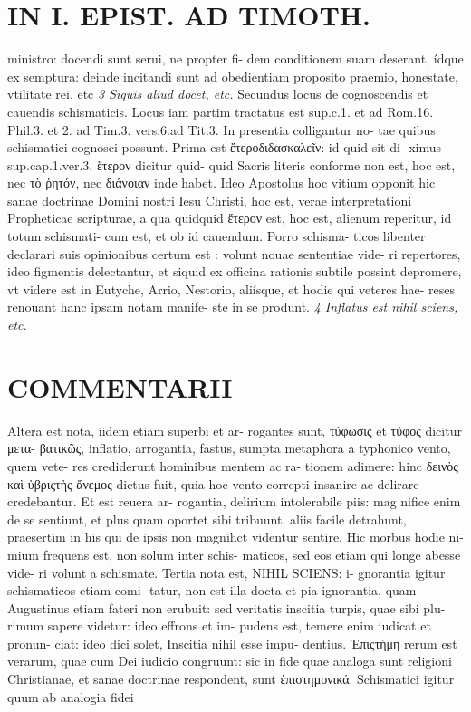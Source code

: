 \documentclass{article}
\begin{document}
\begin{pages}
\section*{IN I. EPIST. AD TIMOTH. }
\marginpar{[ p.149 ]}\pstart ministro: docendi sunt serui, ne propter fi- dem conditionem suam deserant, ídque ex semptura: deinde incitandi sunt ad obedientiam proposito praemio, honestate, vtilitate rei, etc  \pend
\textit{3 Siquis aliud docet, etc. }\pstart Secundus locus de cognoscendis et cauendis schismaticis. Locus iam partim tractatus est sup.c.1. et ad Rom.16. Phil.3. et 2. ad Tim.3. vers.6.ad Tit.3. In presentia colligantur no- tae quibus schismatici cognosci possunt.  \pend\pstart Prima est ἔτεροδιδασκαλεῖν: id quid sit di- ximus sup.cap.1.ver.3. ἕτερον dicitur quid- quid Sacris literis conforme non est, hoc est, nec τὸ ῥητόν, nec διάνοιαν inde habet. Ideo Apostolus hoc vitium opponit hic sanae doctrinae Domini nostri Iesu Christi, hoc est, verae interpretationi Propheticae scripturae, a qua quidquid ἕτερον est, hoc est, alienum reperitur, id totum schismati- cum est, et ob id cauendum. Porro schisma- ticos libenter declarari suis opinionibus certum est : volunt nouae sententiae vide- ri repertores, ideo figmentis delectantur, et siquid ex officina rationis subtile possint depromere, vt videre est in Eutyche, Arrio, Nestorio, aliísque, et hodie qui veteres hae- reses renouant hanc ipsam notam manife- ste in se produnt.  \pend
\textit{4 Inflatus est nihil sciens, etc. }
\section*{COMMENTARII }
\marginpar{[ p.150 ]}\pstart Altera est nota, iidem etiam superbi et ar- rogantes sunt, τύφωσις et τύφος dicitur  μετα- βατικῶς, inflatio, arrogantia, fastus, sumpta metaphora a typhonico vento, quem vete- res crediderunt hominibus mentem ac ra- tionem adimere: hinc δεινὸς καὶ ὑβριςτὴς ἄνεμος dictus fuit, quia hoc vento correpti insanire ac delirare credebantur. Et est reuera ar- rogantia, delirium intolerabile piis: mag nifice enim de se sentiunt, et plus quam oportet sibi tribuunt, aliis facile detrahunt, praesertim in his qui de ipsis non magnihct videntur sentire. Hic morbus hodie ni- mium frequens est, non solum inter schis- maticos, sed eos etiam qui longe abesse vide- ri volunt a schismate.  \pend\pstart Tertia nota est, NIHIL SCIENS: i- gnorantia igitur schismaticos etiam comi- tatur, non est illa docta et pia ignorantia, quam Augustinus etiam fateri non erubuit: sed veritatis inscitia turpis, quae sibi plu- rimum sapere videtur: ideo effrons et im- pudens est, temere enim iudicat et pronun- ciat: ideo dici solet, Inscitia nihil esse impu- dentius. Ἐπιςτήμη rerum est verarum, quae cum Dei iudicio congruunt: sic in fide quae analoga sunt religioni Christianae, et sanae doctrinae respondent, sunt ἑπιστημονικά. Schismatici igitur quum ab analogia fidei  \pend

\end{pages}
\end{document}
